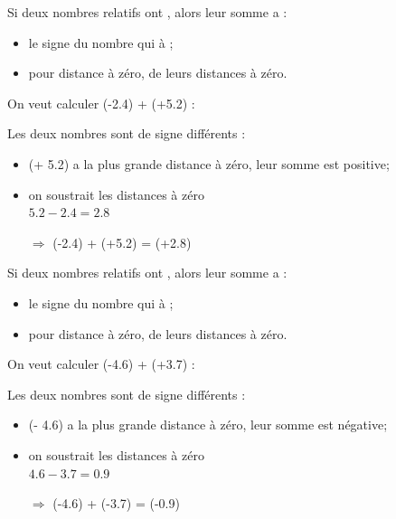 \documentclass[xcolor={dvipsnames}]{beamer}
\begin{document}
\begin{frame}
	\begin{myprop}
		Si deux nombres relatifs ont , alors leur somme a :\pause
		\begin{itemize}
			\item le signe du nombre qui à ; \pause
			\item pour distance à zéro,  de leurs distances à zéro. \pause
		\end{itemize}
	\end{myprop}


	\begin{myex}
		On veut calculer (-\num{2.4}) + (+\num{5.2}) : \pause
		
		Les deux nombres sont de signe différents : \pause
		\begin{itemize}
			\item (+ \num{5.2}) a la plus grande distance à zéro, \pause leur somme est positive; \pause
			\item on soustrait les distances à zéro  \pause \\ $\num{5.2} - \num{2.4} = \num{2.8}$ \pause
			\item[$\Rightarrow$] (-\num{2.4}) + (+\num{5.2}) = \pause (+\num{2.8})
		\end{itemize}
	\end{myex}
\end{frame}


\begin{frame}
	\begin{myprop}
		Si deux nombres relatifs ont , alors leur somme a :\pause
		\begin{itemize}
			\item le signe du nombre qui à ; \pause
			\item pour distance à zéro,  de leurs distances à zéro. \pause
		\end{itemize}
	\end{myprop}
	
	
	\begin{myex}
		On veut calculer (-\num{4.6}) + (+\num{3.7}) : \pause
		
		Les deux nombres sont de signe différents : \pause
		\begin{itemize}
			\item (- \num{4.6}) a la plus grande distance à zéro, leur somme est négative; \pause
			\item on soustrait les distances à zéro \pause \\ $\num{4.6} - \num{3.7} = \num{0.9}$ \pause
			\item[$\Rightarrow$] (-\num{4.6}) + (-\num{3.7}) = \pause (-\num{0.9})
		\end{itemize}
	\end{myex}
\end{frame}
\end{document}
